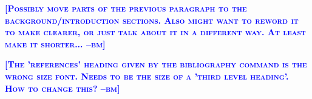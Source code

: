 \documentclass{article} %
\newcommand{\bmcomment}[1]{\textcolor{blue}{\textsc{\textbf{[#1 --bm]}}}}
\begin{document}
\bmcomment{Possibly move parts of the previous paragraph to 
the background/introduction sections. Also might want to reword it to
make clearer, or just talk about it in a different way.  At least
make it shorter...}



\bmcomment{The 'references' heading given by the 
bibliography command is the wrong size font.  Needs to
be the size of a 'third level heading'.  How to change this?}


\end{document}
